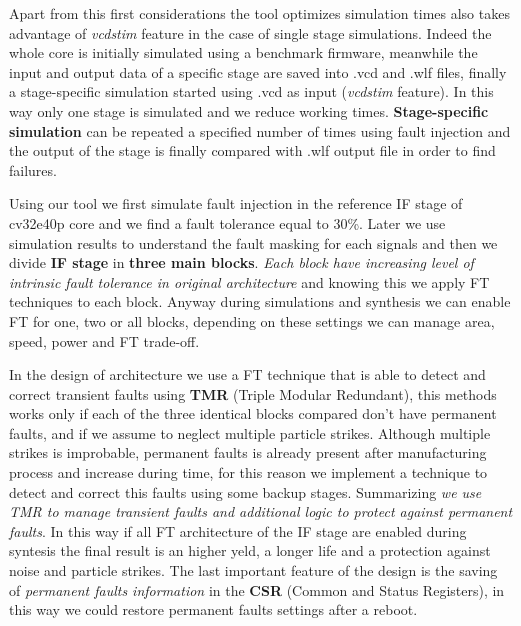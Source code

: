 \documentclass[corpo=11pt,english,numerazioneromana]{toptesi}
\begin{document}
Apart from this first considerations the tool optimizes simulation times also takes advantage of \textit{vcdstim} feature in the case of single stage simulations. Indeed the whole core is  initially simulated using a benchmark firmware, meanwhile the input and output data of a specific stage are saved into .vcd and .wlf files, finally a stage-specific simulation started using .vcd as input (\textit{vcdstim} feature). In this way only one stage is simulated and we reduce working times. \textbf{Stage-specific simulation} can be repeated a specified number of times using fault injection and the output of the stage is finally compared with .wlf output file in order to find failures.   

Using our tool we first simulate fault injection in the reference IF stage of cv32e40p core and we find a fault tolerance equal to 30\%. Later we use simulation results to understand the fault masking for each signals and then we divide \textbf{IF stage} in \textbf{three main blocks}. \textit{Each block have increasing level of intrinsic fault tolerance in original architecture} and knowing this we apply FT techniques to each block. Anyway during simulations and synthesis we can enable FT for one, two or all blocks, depending on these settings we can manage area, speed, power and FT trade-off.
 
In the design of architecture we use a FT technique that is able to detect and correct transient faults using \textbf{ TMR} (Triple Modular Redundant), this methods works only if each of the three identical blocks compared don't have permanent faults, and if we assume to neglect multiple particle strikes. Although multiple strikes is improbable, permanent faults is already present after manufacturing process and increase during time, for this reason we implement a technique to detect and correct this faults using some backup stages. Summarizing \textit{we use TMR to manage transient faults and additional logic to protect against permanent faults}. In this way if all FT architecture of the IF stage are enabled during syntesis the final result is an higher yeld, a longer life and a protection against noise and particle strikes. The last important feature of the design is the saving of \textit{permanent faults information} in the \textbf{CSR} (Common and Status Registers),  in this way we could restore permanent faults settings after a reboot. 


\hypersetup{%
	linkcolor=black
}
\end{document}
